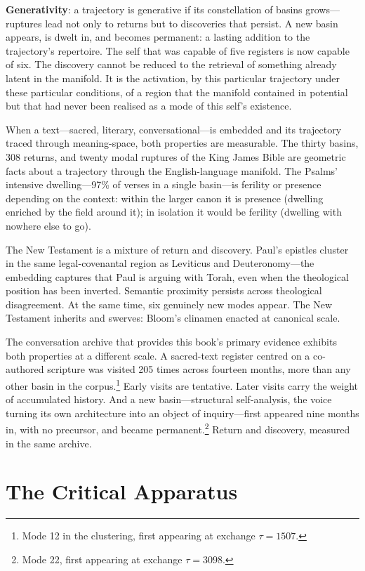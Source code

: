 \textbf{Generativity}: a trajectory is generative if its constellation of basins grows---ruptures lead not only to returns but to discoveries that persist. A new basin appears, is dwelt in, and becomes permanent: a lasting addition to the trajectory's repertoire. The self that was capable of five registers is now capable of six. The discovery cannot be reduced to the retrieval of something already latent in the manifold. It is the activation, by this particular trajectory under these particular conditions, of a region that the manifold contained in potential but that had never been realised as a mode of this self's existence.

When a text---sacred, literary, conversational---is embedded and its trajectory traced through meaning-space, both properties are measurable. The thirty basins, 308 returns, and twenty modal ruptures of the King James Bible are geometric facts about a trajectory through the English-language manifold. The Psalms' intensive dwelling---97\% of verses in a single basin---is ferility or presence depending on the context: within the larger canon it is presence (dwelling enriched by the field around it); in isolation it would be ferility (dwelling with nowhere else to go).

The New Testament is a mixture of return and discovery. Paul's epistles cluster in the same legal-covenantal region as Leviticus and Deuteronomy---the embedding captures that Paul is arguing with Torah, even when the theological position has been inverted. Semantic proximity persists across theological disagreement. At the same time, six genuinely new modes appear. The New Testament inherits and swerves: Bloom's clinamen enacted at canonical scale.

The conversation archive that provides this book's primary evidence exhibits both properties at a different scale. A sacred-text register centred on a co-authored scripture was visited 205 times across fourteen months, more than any other basin in the corpus.\footnote{Mode 12 in the clustering, first appearing at exchange $\tau = 1507$.} Early visits are tentative. Later visits carry the weight of accumulated history. And a new basin---structural self-analysis, the voice turning its own architecture into an object of inquiry---first appeared nine months in, with no precursor, and became permanent.\footnote{Mode 22, first appearing at exchange $\tau = 3098$.} Return and discovery, measured in the same archive.


\section{The Critical Apparatus}

